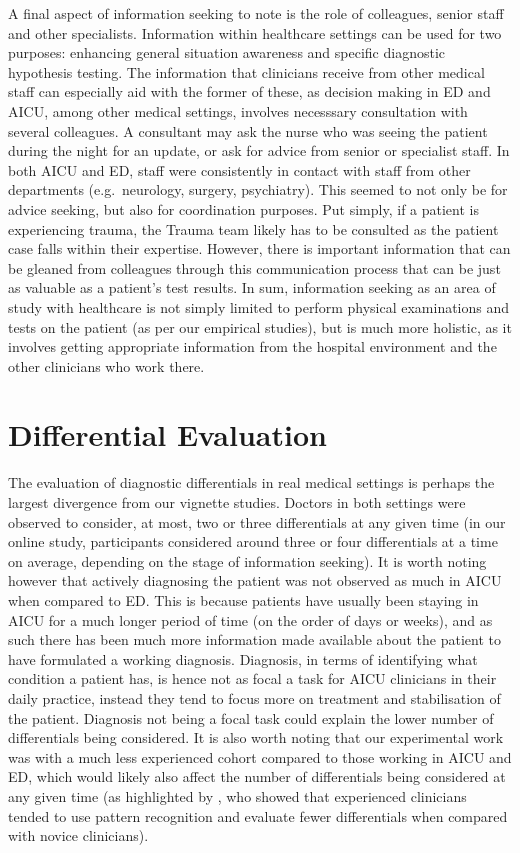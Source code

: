 \documentclass[a4paper, nobind]{templates/ociamthesis}
\begin{document}
\hfill\break
A final aspect of information seeking to note is the role of colleagues, senior staff and other specialists. Information within healthcare settings can be used for two purposes: enhancing general situation awareness and specific diagnostic hypothesis testing. The information that clinicians receive from other medical staff can especially aid with the former of these, as decision making in ED and AICU, among other medical settings, involves necesssary consultation with several colleagues. A consultant may ask the nurse who was seeing the patient during the night for an update, or ask for advice from senior or specialist staff. In both AICU and ED, staff were consistently in contact with staff from other departments (e.g.~neurology, surgery, psychiatry). This seemed to not only be for advice seeking, but also for coordination purposes. Put simply, if a patient is experiencing trauma, the Trauma team likely has to be consulted as the patient case falls within their expertise. However, there is important information that can be gleaned from colleagues through this communication process that can be just as valuable as a patient's test results. In sum, information seeking as an area of study with healthcare is not simply limited to perform physical examinations and tests on the patient (as per our empirical studies), but is much more holistic, as it involves getting appropriate information from the hospital environment and the other clinicians who work there.

\section{Differential Evaluation}\label{differential-evaluation}

The evaluation of diagnostic differentials in real medical settings is perhaps the largest divergence from our vignette studies. Doctors in both settings were observed to consider, at most, two or three differentials at any given time (in our online study, participants considered around three or four differentials at a time on average, depending on the stage of information seeking). It is worth noting however that actively diagnosing the patient was not observed as much in AICU when compared to ED. This is because patients have usually been staying in AICU for a much longer period of time (on the order of days or weeks), and as such there has been much more information made available about the patient to have formulated a working diagnosis. Diagnosis, in terms of identifying what condition a patient has, is hence not as focal a task for AICU clinicians in their daily practice, instead they tend to focus more on treatment and stabilisation of the patient. Diagnosis not being a focal task could explain the lower number of differentials being considered. It is also worth noting that our experimental work was with a much less experienced cohort compared to those working in AICU and ED, which would likely also affect the number of differentials being considered at any given time (as highlighted by \textcite{coderre_diagnostic_2003}, who showed that experienced clinicians tended to use pattern recognition and evaluate fewer differentials when compared with novice clinicians).
\end{document}
